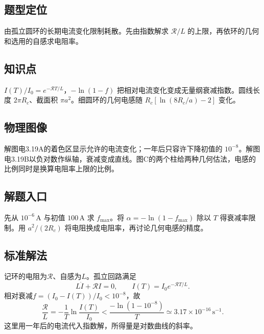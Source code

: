 \documentclass[UTF8,fontset=fandol,a4paper,11pt]{ctexart}
\begin{document}
\subsection*{题型定位}

由孤立圆环的长期电流变化限制耗散。先由指数解求 $\mathcal R/L$ 的上限，再依环的几何和选用的自感求电阻率。



\subsection*{知识点}

$I(T)/I_0=e^{-\mathcal RT/L}$，$-\ln(1-f)$ 把相对电流变化变成无量纲衰减指数。圆线长度 $2\pi R_c$、截面积 $\pi a^2$。细圆环的几何电感随 $R_c[\ln(8R_c/a)-2]$ 变化。



\subsection*{物理图像}

解图电3.19A的着色区显示允许的电流变化；一年后只容许下降初值的 $10^{-8}$。解图电3.19B以负对数作纵轴，衰减变成直线。图C的两个柱给两种几何估法，电感的比例同时是换算电阻率上限的比例。



\subsection*{解题入口}

先从 $10^{-6}\,\mathrm A$ 与初值 $100\,\mathrm A$ 求 $f_{\max}$。将 $\alpha=-\ln(1-f_{\max})$ 除以 $T$ 得衰减率限制。用 $a^2/(2R_c)$ 将电阻换成电阻率，再讨论几何电感的精度。


\subsection*{标准解法}

记环的电阻为$\mathcal R$、自感为$L$。孤立回路满足
\[
L\dot I+\mathcal RI=0,\qquad I(T)=I_0e^{-\mathcal RT/L}.
\]
相对衰减$f=(I_0-I(T))/I_0<10^{-8}$，故
\[
\frac{\mathcal R}{L}=-\frac1T\ln\frac{I(T)}{I_0}
<\frac{-\ln(1-10^{-8})}{T}
\simeq3.17\times10^{-16}\,\mathrm{s^{-1}}.
\]
这里用一年后的电流代入指数解，所得量是对数曲线的斜率。
\end{document}
